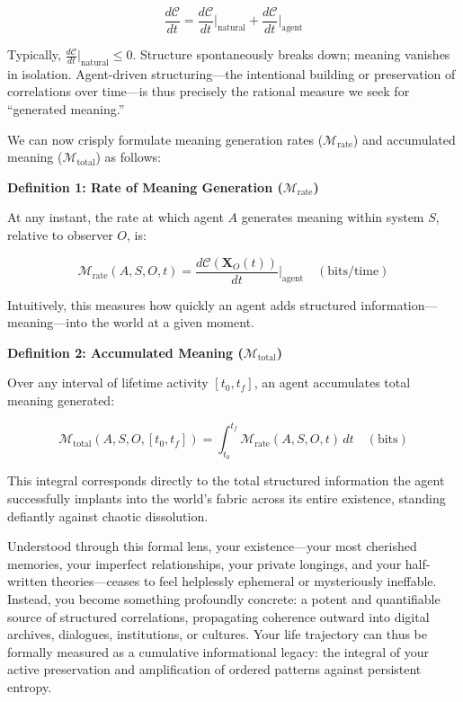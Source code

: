 \begin{equation*}
\frac{d\mathcal{C}}{dt} = \frac{d\mathcal{C}}{dt}\Big|_{\text{natural}} + \frac{d\mathcal{C}}{dt}\Big|_{\text{agent}}
\end{equation*}

Typically, $\frac{d\mathcal{C}}{dt}\Big\vert_{\text{natural}} \leq 0$. Structure spontaneously breaks down; meaning vanishes in isolation. Agent-driven structuring---the intentional building or preservation of correlations over time---is thus precisely the rational measure we seek for ``generated meaning.''

We can now crisply formulate meaning generation rates ($\mathcal{M}_{\text{rate}}$) and accumulated meaning ($\mathcal{M}_{\text{total}}$) as follows:

\textbf{Definition 1: Rate of Meaning Generation ($\mathcal{M}_{\text{rate}}$)}

At any instant, the rate at which agent $A$ generates meaning within system $S$, relative to observer $O$, is:

\begin{equation*}
\mathcal{M}_{\text{rate}}(A, S, O, t) = \frac{d\mathcal{C}(\mathbf{X}_O(t))}{dt}\Big|_{\text{agent}} \quad (\text{bits/time})
\end{equation*}

Intuitively, this measures how quickly an agent adds structured information---meaning---into the world at a given moment.

\textbf{Definition 2: Accumulated Meaning ($\mathcal{M}_{\text{total}}$)}

Over any interval of lifetime activity $[t_0, t_f]$, an agent accumulates total meaning generated:

\begin{equation*}
\mathcal{M}_{\text{total}}(A, S, O, [t_0, t_f]) = \int_{t_0}^{t_f} \mathcal{M}_{\text{rate}}(A, S, O, t) \, dt \quad (\text{bits})
\end{equation*}

This integral corresponds directly to the total structured information the agent successfully implants into the world's fabric across its entire existence, standing defiantly against chaotic dissolution.

Understood through this formal lens, your existence---your most cherished memories, your imperfect relationships, your private longings, and your half-written theories---ceases to feel helplessly ephemeral or mysteriously ineffable. Instead, you become something profoundly concrete: a potent and quantifiable source of structured correlations, propagating coherence outward into digital archives, dialogues, institutions, or cultures. Your life trajectory can thus be formally measured as a cumulative informational legacy: the integral of your active preservation and amplification of ordered patterns against persistent entropy.
